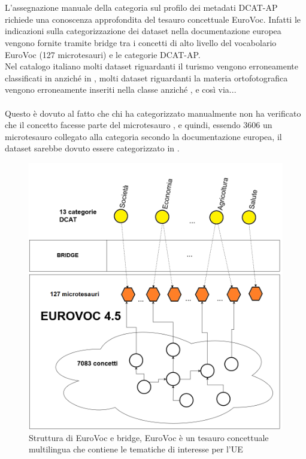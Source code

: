 \documentclass{article}
\theoremstyle{plain}
\theoremstyle{definition}
\begin{document}
\\
\\
L'assegnazione manuale della categoria sul profilo dei metadati DCAT-AP richiede una conoscenza approfondita del tesauro concettuale EuroVoc.
Infatti le indicazioni sulla categorizzazione dei dataset nella documentazione europea vengono fornite tramite bridge tra i concetti di alto livello del vocabolario EuroVoc (127 microtesauri) e le categorie DCAT-AP. 
\\
Nel catalogo italiano molti dataset riguardanti
il turismo vengono erroneamente classificati in  anziché in , molti dataset riguardanti la materia ortofotografica vengono erroneamente inseriti nella classe  anziché , e così via...
\\
\\
Questo è dovuto al fatto che chi ha categorizzato manualmente non ha verificato che il concetto  facesse parte del microtesauro , e quindi, essendo 3606 un microtesauro collegato alla categoria  secondo la documentazione europea, il dataset sarebbe dovuto essere categorizzato in . 
\begin{figure}[htbp]
\begin{center}
\includegraphics[scale=0.45]{img/eurovocdcat.png}
\caption{Struttura di EuroVoc e bridge, EuroVoc è un  tesauro concettuale multilingua che contiene le tematiche di interesse per l'UE}
\end{center}
\end{figure}
\end{document}
